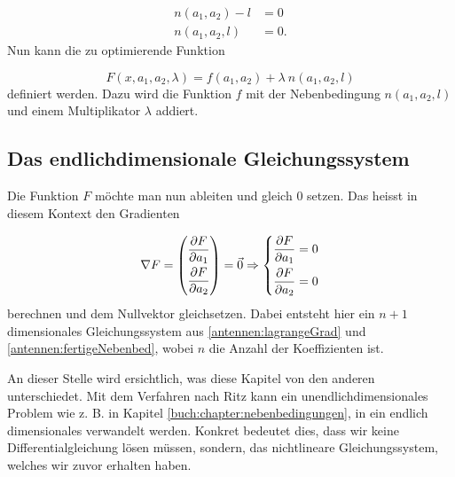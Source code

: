 \begin{equation}
\begin{aligned}
	n(a_1, a_2) - l
	&=
	0
	\\
	n(a_1, a_2, l)
	&=
	0.
\label{antennen:fertigeNebenbed}
\end{aligned}
\end{equation}
Nun kann die zu optimierende Funktion

\begin{equation}
F(x,a_1,a_2,\lambda)
= 
f(a_1,a_2)+\lambda \: n(a_1,a_2, l)
\end{equation}
definiert werden. Dazu wird die Funktion $f$ mit der Nebenbedingung $n(a_1,a_2,l)$ und einem
Multiplikator $\lambda$ addiert.

\subsection{Das endlichdimensionale Gleichungssystem\label{antennen:lagrangeGLsys}}

Die Funktion $F$ möchte man nun ableiten und gleich 0 setzen. Das heisst in diesem Kontext
den Gradienten

\begin{equation}
	\nabla F 
	=
	\begin{pmatrix} 
		\frac{\displaystyle\strut\partial F}{\displaystyle\strut\partial a_1} 
		\\ 
		\frac{\displaystyle\strut\partial F}{\displaystyle\strut\partial a_2}  
	\end{pmatrix} 
	= 
	\vec{0} \Rightarrow
	\left\{
	\begin{aligned}
		\frac{\partial F}{\partial a_1} = 0 \\
		\frac{\partial F}{\partial a_2} = 0
	\end{aligned}
	\right.
	\label{antennen:lagrangeGrad}
\end{equation}
berechnen und dem Nullvektor gleichsetzen. Dabei entsteht hier ein 
$n+1$ dimensionales Gleichungssystem aus \eqref{antennen:lagrangeGrad} und \eqref{antennen:fertigeNebenbed},
wobei $n$ die Anzahl der Koeffizienten ist.

An dieser Stelle wird ersichtlich, was diese Kapitel von den anderen unterschiedet. Mit dem Verfahren nach Ritz  
kann ein unendlichdimensionales
Problem wie z. B. in Kapitel \ref{buch:chapter:nebenbedingungen}, in ein endlich dimensionales verwandelt werden. 
Konkret bedeutet dies, dass wir keine Differentialgleichung lösen müssen, sondern, 
das nichtlineare Gleichungssystem, welches wir zuvor erhalten haben.

